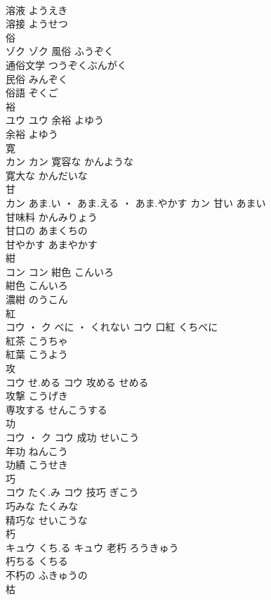 \documentclass[8pt]{extreport}
\begin{document}
\begin{CJK}{UTF8}{min}
\\	溶液	ようえき	
\\	溶接	ようせつ	
\\	俗	
\\	ゾク		ゾク	風俗	ふうぞく	
\\	通俗文学	つうぞくぶんがく	
\\	民俗	みんぞく	
\\	俗語	ぞくご	
\\	裕	
\\	ユウ		ユウ	余裕	よゆう	
\\	余裕	よゆう	
\\	寛	
\\	カン		カン	寛容な	かんような	
\\	寛大な	かんだいな	
\\	甘	
\\	カン	あま.い ・ あま.える ・ あま.やかす	カン	甘い	あまい	
\\	甘味料	かんみりょう	
\\	甘口の	あまくちの	
\\	甘やかす	あまやかす	
\\	紺	
\\	コン		コン	紺色	こんいろ	
\\	紺色	こんいろ	
\\	濃紺	のうこん	
\\	紅	
\\	コウ ・ ク	べに ・ くれない	コウ	口紅	くちべに	
\\	紅茶	こうちゃ	
\\	紅葉	こうよう	
\\	攻	
\\	コウ	せ.める	コウ	攻める	せめる	
\\	攻撃	こうげき	
\\	専攻する	せんこうする	
\\	功	
\\	コウ ・ ク		コウ	成功	せいこう	
\\	年功	ねんこう	
\\	功績	こうせき	
\\	巧	
\\	コウ	たく.み	コウ	技巧	ぎこう	
\\	巧みな	たくみな	
\\	精巧な	せいこうな	
\\	朽	
\\	キュウ	くち.る	キュウ	老朽	ろうきゅう	
\\	朽ちる	くちる	
\\	不朽の	ふきゅうの	
\\	枯	

\end{CJK}
\end{document}
